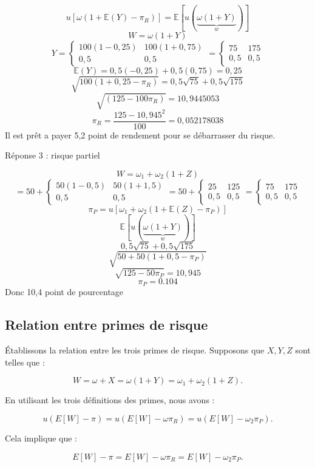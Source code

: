 \documentclass[a4paper, 12pt]{report}
\begin{document}
\[ 
u\left[ \omega(1+\mathbb{E}(Y)-\pi_R) \right] =\mathbb{E}\left[ u(\underbrace{\omega(1+Y)}_{w})\right] 
\]
\[ 
W=\omega(1+Y)
\]
\[
Y = \begin{cases}
	100(1-0,25) & 100(1+0,75)\\
	0,5 & 0,5
\end{cases} = \begin{cases}
75  & 175\\
0,5  &  0,5
\end{cases}
\]
\[  
\mathbb{E}(Y)=0,5(-0,25)+0,5(0,75)=0,25
\]
\[ 
\sqrt{100(1+0,25-\pi_R)}=0,5\sqrt{75}+0,5\sqrt{175}
 \]
\[ 
\sqrt{(125-100\pi_R)}=10,9445053
\]
\[ 
\pi_R=\frac{125-10,945^2}{100}=0,052178038
 \]
Il est prêt a payer 5,2 point de rendement pour se débarrasser du risque. 

Réponse 3 : risque partiel

\[ 
W=\omega_1+\omega_2(1+Z)
 \]
\[
= 50 + \begin{cases}
	50(1-0,5) & 50(1+1,5)\\
	0,5 & 0,5
\end{cases} = 50+\begin{cases}
	25  & 125\\
	0,5  &  0,5
\end{cases}= \begin{cases}
75  & 175\\
0,5  &  0,5
\end{cases}
\]
\[ 
\pi_P=u\left[ \omega_1+\omega_2(1+\mathbb{E}(Z)-\pi_P) \right] 
 \]
\[ 
\mathbb{E}\left[ u(\underbrace{\omega(1+Y)}_{w}) \right] 
 \]
\[ 
0,5\sqrt{75}+0,5\sqrt{175}
 \]
 \[ 
 \sqrt{50+50(1+0,5-\pi_P)}
  \]
\[ 
\sqrt{125-50\pi_P}=10,945
 \]
\[ 
\pi_P=0.104
 \]
Donc 10,4 point de pourcentage 

\subsection{Relation entre primes de risque}

Établissons la relation entre les trois primes de risque. Supposons que \( X, Y, Z \) sont telles que :

\[
W = \omega + X = \omega(1 + Y) = \omega_1 + \omega_2 (1+ Z).
\]

En utilisant les trois définitions des primes, nous avons :

\[
u(E[W]- \pi)  = u(E[W]- \omega \pi_R)  = u(E[W]- \omega_2 \pi_P) .
\]

Cela implique que :

\[
E[W] - \pi = E[W] - \omega \pi_R = E[W] - \omega_2 \pi_P.
\]
\end{document}
